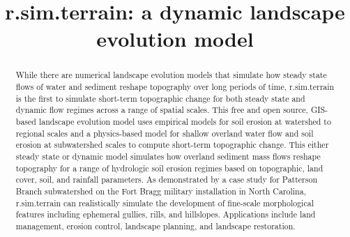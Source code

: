 \documentclass[gmd, manuscript]{copernicus}
\begin{document}
\title{\lowercase{r.sim.terrain}: a dynamic landscape evolution model} 






\received{}
\pubdiscuss{}
\revised{}
\accepted{}
\published{}


\maketitle

\begin{abstract}
While there are numerical landscape evolution models
that simulate how steady state flows of water and sediment
reshape topography over long periods of time, 
r.sim.terrain is the first to 
simulate short-term topographic change 
for both steady state and dynamic flow regimes
across a range of spatial scales.
This free and open source, 
GIS-based landscape evolution model
uses empirical models for soil erosion
at watershed to regional scales 
and a physics-based model
for shallow overland water flow and soil erosion 
at subwatershed scales
to compute short-term topographic change. 
This either steady state or dynamic model simulates
how overland sediment mass flows reshape topography
for a range of hydrologic soil erosion regimes
based on topographic, land cover, soil, and rainfall parameters. 
As demonstrated by a case study 
for Patterson Branch subwatershed
on the Fort Bragg military installation in North Carolina,
r.sim.terrain can realistically simulate the development of 
fine-scale morphological features including 
ephemeral gullies, rills, and hillslopes.
Applications include land management, erosion control,
landscape planning, and landscape restoration. 
\end{abstract}
\end{document}
